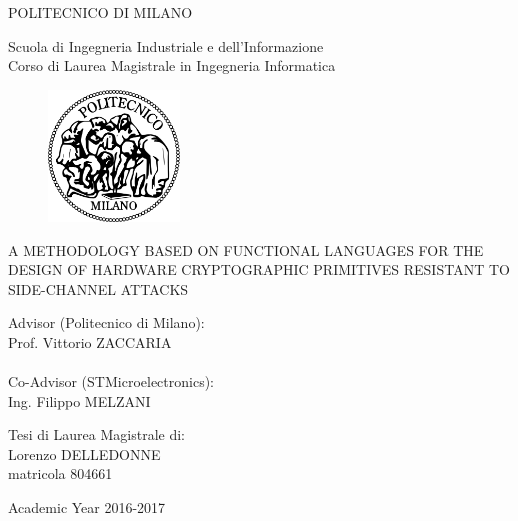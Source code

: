 \documentclass[11pt,a4paper,twoside,openright]{report}
\begin{document}
\vspace*{-1.5cm} 
\begin{center}
  \large
  POLITECNICO DI MILANO\\
  \normalsize
  
  Scuola di Ingegneria Industriale e dell'Informazione\\
  Corso di Laurea Magistrale in Ingegneria Informatica\\
  
  \vspace*{0.3cm}

  \begin{figure}[htbp]
    \begin{center}
      \includegraphics[width=3.5cm]{./src/logo_pdm.pdf}
    \end{center}
  \end{figure}
  \vspace*{0.3cm} \LARGE



  A METHODOLOGY BASED ON FUNCTIONAL LANGUAGES
           FOR THE DESIGN OF HARDWARE CRYPTOGRAPHIC 
           PRIMITIVES RESISTANT TO SIDE-CHANNEL ATTACKS\\



           \vspace*{.75truecm}
\end{center}
\vspace*{2.5cm} \large
\begin{flushleft}


  {Advisor (Politecnico di Milano)}:\\ Prof. Vittorio ZACCARIA\\
  ~\\
  Co-Advisor (STMicroelectronics):\\ Ing. Filippo MELZANI

\end{flushleft}
\vspace*{1.0cm}
\begin{flushright}

  Tesi di Laurea Magistrale di:\\ Lorenzo DELLEDONNE\\ matricola 804661


\end{flushright}
\vspace*{1.0cm}
\begin{center}


  Academic Year 2016-2017 
\end{center} 
\clearpage
\end{document}

